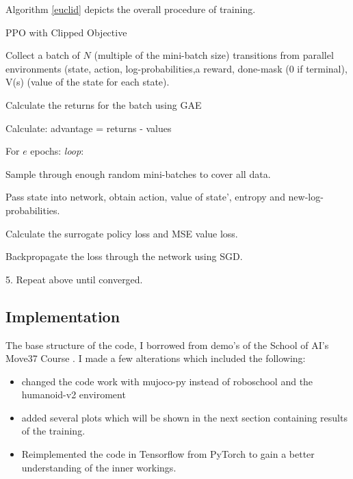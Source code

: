 \documentclass[12pt,a4paper]{article}
\begin{document}
Algorithm \ref{euclid} depicts the overall procedure of training.
\begin{algorithm}
\caption{PPO with Clipped Objective }\label{euclid}
\begin{algorithmic}[1]
\item Collect a batch of $N$ (multiple of the mini-batch size) transitions from parallel environments \newline (state, action, log-probabilities,a reward, done-mask (0 if terminal), V(s) (value of the state for each state).
\item Calculate the returns for the batch using GAE
\item Calculate: advantage = returns - values
\item For $e$ epochs: \emph{loop}:
\begin{algorithmic}[1]
\item Sample through enough random mini-batches to cover all data.
\item Pass state into network, obtain action, value of state', entropy and new-log-probabilities.
\item Calculate the surrogate policy loss and MSE value loss.
\item Backpropagate the loss through the network using SGD.
\end{algorithmic}
\item 5. Repeat above until converged.
\end{algorithmic}
\end{algorithm}



\subsection{Implementation}

The base structure of the code, I borrowed from demo's of the  School of AI's Move37 Course \cite{code}. I made a few alterations which included the following:
\begin{itemize}
\item changed the code work with mujoco-py instead of roboschool and the humanoid-v2 enviroment
\item added several plots which will be shown in the next section containing results of the training.
\item Reimplemented the code in Tensorflow from PyTorch to gain a better understanding of the inner workings.
\end{itemize}
\end{document}
